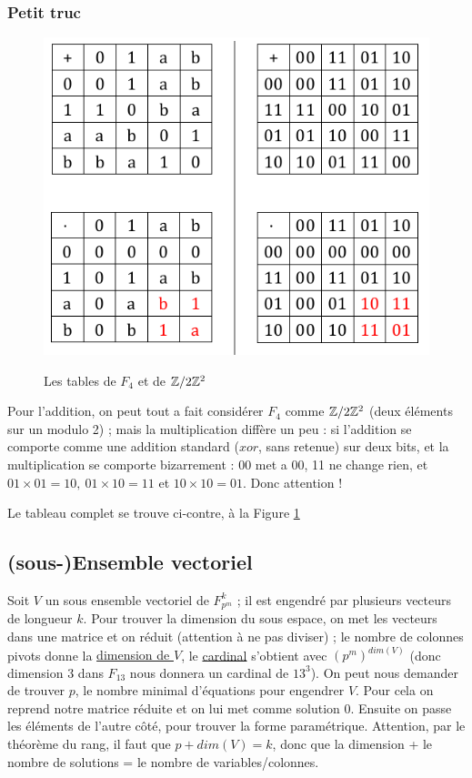 \documentclass[11pt,a4paper]{article}
\renewcommand{\)}{\right)}
\renewcommand{\(}{\left(}
\begin{document}
\subsubsection{Petit truc}
\begin{figure}
	\centering
	\captionsetup{justification=centering}
	\caption{Les tables de $F_4$ et de $\mathbb{Z}/2\mathbb{Z}^2$}
	\includegraphics[scale=0.5]{images/tables_f4}
	\label{f4_z4}
\end{figure}
Pour l'addition, on peut tout a fait considérer $F_4$ comme $\mathbb{Z}/2\mathbb{Z}^2$ (deux éléments sur un modulo 2) ; mais la multiplication diffère un peu : si l'addition se comporte comme une addition standard ($xor$, sans retenue) sur deux bits, et la multiplication se comporte bizarrement : 00 met a 00, 11 ne change rien, et $01\times 01 = 10,\ 01\times 10 = 11$ et $10\times 10 = 01$. Donc attention !

Le tableau complet se trouve ci-contre, à la Figure \ref{f4_z4}

\subsection{(sous-)Ensemble vectoriel}
Soit $V$ un sous ensemble vectoriel  de $F_{p^m}^k$ ; il est engendré par plusieurs vecteurs de longueur $k$. Pour trouver la dimension du sous espace, on met les vecteurs dans une matrice et on réduit (attention à ne pas diviser) ; le nombre de colonnes pivots donne la \uline{dimension de $V$}, le \uline{cardinal} s'obtient avec $(p^m)^{dim(V)}$ (donc dimension 3 dans $F_{13}$ nous donnera un cardinal de $13^3$). On peut nous demander de trouver $p$, le nombre minimal d'équations pour engendrer $V$. Pour cela on reprend notre matrice réduite et on lui met comme solution 0. Ensuite on passe les éléments de l'autre côté, pour trouver la forme paramétrique. Attention, par le théorème du rang, il faut que $p + dim(V) = k$, donc que la dimension + le nombre de solutions = le nombre de variables/colonnes.
\end{document}
